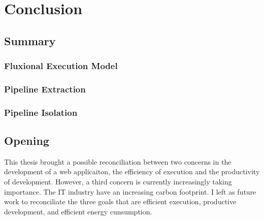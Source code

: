 \chapter{Conclusion} \label{chapter8}
\minitoc
\eject



\section{Summary}

\subsection{Fluxional Execution Model}

\subsection{Pipeline Extraction}

\subsection{Pipeline Isolation}


\section{Opening}

This thesis brought a possible reconciliation between two concerns in the development of a web applicaiton, the efficiency of execution and the productivity of development.
However, a third concern is currently increasingly taking importance.
The IT industry have an increasing carbon footprint.
I left as future work to reconciliate the three goals that are efficient execution, productive development, and efficient energy cunsumption.